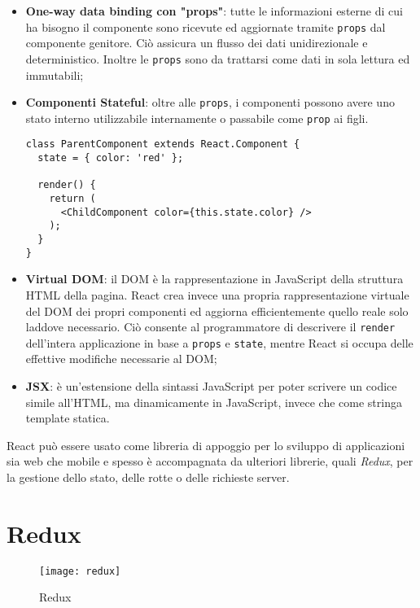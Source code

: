 \begin{itemize}
  \item \textbf{One-way data binding con "props"}: tutte le informazioni esterne di cui ha bisogno il componente sono ricevute ed aggiornate tramite \texttt{props} dal componente genitore. Ciò assicura un flusso dei dati unidirezionale e deterministico. Inoltre le \texttt{props} sono da trattarsi come dati in sola lettura ed immutabili;
  \item \textbf{Componenti Stateful}: oltre alle \texttt{props}, i componenti possono avere uno stato interno utilizzabile internamente o passabile come \texttt{prop} ai figli.

  \vfill

    \begin{lstlisting}[language={[Sharp]C},basicstyle=\footnotesize]
class ParentComponent extends React.Component {
  state = { color: 'red' };

  render() {
    return (
      <ChildComponent color={this.state.color} />
    );
  }
}
    \end{lstlisting}

  \item \textbf{Virtual DOM}: il DOM è la rappresentazione in JavaScript della struttura HTML della pagina. React crea invece una propria rappresentazione virtuale del DOM dei propri componenti ed aggiorna efficientemente quello reale solo laddove necessario. Ciò consente al programmatore di descrivere il \texttt{render} dell'intera applicazione in base a \texttt{props} e \texttt{state}, mentre React si occupa delle effettive modifiche necessarie al DOM;
  \item \textbf{JSX}: è un'estensione della sintassi JavaScript per poter scrivere un codice simile all'HTML, ma dinamicamente in JavaScript, invece che come stringa template statica.
\end{itemize}

React può essere usato come libreria di appoggio per lo sviluppo di applicazioni sia web che mobile e spesso è accompagnata da ulteriori librerie, quali \textit{Redux}, per la gestione dello stato, delle rotte o delle richieste server.

\section{Redux}

\begin{figure}[H] 
  \centering 
  \texttt{[image: redux]} 
  \caption{Redux}
\end{figure}

